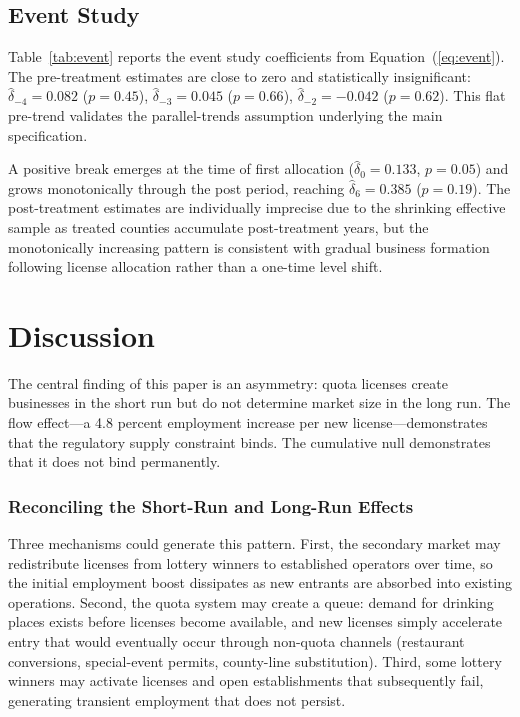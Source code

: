 \documentclass[12pt]{article}
\begin{document}
\subsection{Event Study}

Table~\ref{tab:event} reports the event study coefficients from Equation~(\ref{eq:event}). The pre-treatment estimates are close to zero and statistically insignificant: $\hat{\delta}_{-4} = 0.082$ ($p = 0.45$), $\hat{\delta}_{-3} = 0.045$ ($p = 0.66$), $\hat{\delta}_{-2} = -0.042$ ($p = 0.62$). This flat pre-trend validates the parallel-trends assumption underlying the main specification.

A positive break emerges at the time of first allocation ($\hat{\delta}_0 = 0.133$, $p = 0.05$) and grows monotonically through the post period, reaching $\hat{\delta}_6 = 0.385$ ($p = 0.19$). The post-treatment estimates are individually imprecise due to the shrinking effective sample as treated counties accumulate post-treatment years, but the monotonically increasing pattern is consistent with gradual business formation following license allocation rather than a one-time level shift.



\section{Discussion}

The central finding of this paper is an asymmetry: quota licenses create businesses in the short run but do not determine market size in the long run. The flow effect---a 4.8 percent employment increase per new license---demonstrates that the regulatory supply constraint binds. The cumulative null demonstrates that it does not bind permanently.

\subsubsection*{Reconciling the Short-Run and Long-Run Effects} Three mechanisms could generate this pattern. First, the secondary market may redistribute licenses from lottery winners to established operators over time, so the initial employment boost dissipates as new entrants are absorbed into existing operations. Second, the quota system may create a queue: demand for drinking places exists before licenses become available, and new licenses simply accelerate entry that would eventually occur through non-quota channels (restaurant conversions, special-event permits, county-line substitution). Third, some lottery winners may activate licenses and open establishments that subsequently fail, generating transient employment that does not persist.
\end{document}
